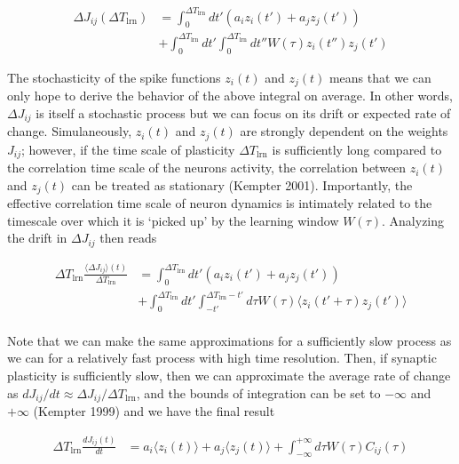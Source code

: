 \documentclass{ucetd}
\begin{document}
\begin{align}
\Delta J_{ij}(\Delta T_{\mathrm{lrn}}) &= \int_{0}^{\Delta T_{\mathrm{lrn}}} dt'\left(a_{i}z_{i}(t') + a_{j}z_{j}(t')\right) \\
&+ \int_{0}^{\Delta T_{\mathrm{lrn}}} dt'\int_{0}^{\Delta T_{\mathrm{lrn}}} dt''W(\tau)z_{i}(t'')z_{j}(t')
\end{align}

The stochasticity of the spike functions $z_{i}(t)$ and $z_{j}(t)$ means that we can only hope to derive the behavior of the above integral on average. In other words, $\Delta J_{ij}$ is itself a stochastic process but we can focus on its drift or expected rate of change. Simulaneously, $z_{i}(t)$ and $z_{j}(t)$ are strongly dependent on the weights $J_{ij}$; however, if the time scale of plasticity $\Delta T_{\mathrm{lrn}}$ is sufficiently long compared to the correlation time scale of the neurons activity, the correlation between $z_{i}(t)$ and $z_{j}(t)$ can be treated as stationary (Kempter 2001). Importantly, the effective correlation time scale of neuron dynamics is intimately related to the timescale over which it is `picked up' by the learning window $W(\tau)$. Analyzing the drift in $\Delta J_{ij}$ then reads


\begin{align*}
\Delta T_{\mathrm{lrn}}\frac{\langle \Delta J_{ij}\rangle(t)}{\Delta T_{\mathrm{lrn}}} &= \int_{0}^{\Delta T_{\mathrm{lrn}}} dt'\left(a_{i}z_{i}(t') + a_{j}z_{j}(t')\right)\\
&+ \int_{0}^{\Delta T_{\mathrm{lrn}}} dt'\int_{-t'}^{\Delta T_{\mathrm{lrn}}-t'} d\tau W(\tau)\langle z_{i}(t'+\tau)z_{j}(t')\rangle\\
\end{align*}

Note that we can make the same approximations for a sufficiently slow process as we can for a relatively fast process with high time resolution. Then, if synaptic plasticity is sufficiently slow, then we can approximate the average rate of change as $dJ_{ij}/dt \approx \Delta J_{ij}/\Delta T_{\mathrm{lrn}}$, and the bounds of integration can be set to $-\infty$ and $+\infty$ (Kempter 1999) and we have the final result


\begin{align}
\Delta T_{\mathrm{lrn}}\frac{d J_{ij}(t)}{dt} &=  a_{i}\langle z_{i}(t)\rangle  + a_{j}\langle z_{j}(t)\rangle + \int_{-\infty}^{+\infty} d\tau W(\tau)C_{ij}(\tau)
\end{align}
\end{document}
